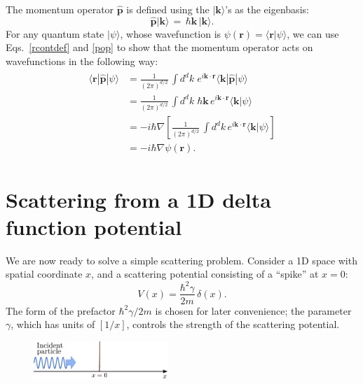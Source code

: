 \documentclass[prx,12pt]{revtex4-2}
\begin{document}
The momentum operator $\hat{\mathbf{p}}$ is defined using the
$|\mathbf{k}\rangle$'s as the eigenbasis:
\begin{equation}
  \hat{\mathbf{p}} |\mathbf{k}\rangle \,=\, \hbar \mathbf{k}\, |\mathbf{k}\rangle.
  \label{pop}
\end{equation}
For any quantum state $|\psi\rangle$, whose wavefunction is
$\psi(\mathbf{r}) = \langle \mathbf{r}|\psi\rangle$, we can use
Eqs.~\eqref{rcontdef} and \eqref{pop} to show that the momentum
operator acts on wavefunctions in the following way:
\begin{align}
  \begin{aligned}\langle \mathbf{r}|\hat{\mathbf{p}}|\psi\rangle
    &= \frac{1}{(2\pi)^{d/2}} \, \int d^dk \; e^{i\mathbf{k}\cdot\mathbf{r}} \langle \mathbf{k} | \hat{\mathbf{p}} | \psi\rangle \\
    &= \frac{1}{(2\pi)^{d/2}} \, \int d^dk \; \hbar\mathbf{k} \, e^{i\mathbf{k}\cdot\mathbf{r}} \langle \mathbf{k} | \psi\rangle \\
    &= -i \hbar\nabla \left[\frac{1}{(2\pi)^{d/2}} \, \int d^dk \, e^{i\mathbf{k}\cdot\mathbf{r}} \langle \mathbf{k} | \psi\rangle \right] \\
    &= -i\hbar \nabla\psi(\mathbf{r}).
  \end{aligned}
\end{align}

\section{Scattering from a 1D delta function potential}
\label{sec:1dscatter}

We are now ready to solve a simple scattering problem.  Consider a 1D
space with spatial coordinate $x$, and a scattering potential
consisting of a ``spike'' at $x = 0$:
\begin{equation}
  V(x) = \frac{\hbar^2\gamma}{2m} \,\delta(x).
  \label{Vdeltaf}
\end{equation}
The form of the prefactor $\hbar^2\gamma/2m$ is chosen for later
convenience; the parameter $\gamma$, which has units of $[1/x]$,
controls the strength of the scattering potential.

\begin{figure}[h]
  \centering\includegraphics[width=0.45\textwidth]{scattering1d}
\end{figure}
\end{document}

